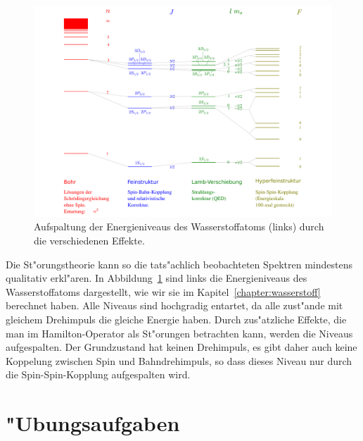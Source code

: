 \begin{figure}
\centering
\includegraphics[width=\hsize]{images/WasserstoffAufspaltung.pdf}
\caption{Aufspaltung der Energieniveaus des Wasserstoffatoms (links)
durch die verschiedenen Effekte.
\label{skript:wasserstoffaufspaltung}}
\end{figure}
Die St"orungstheorie kann so die tats"achlich beobachteten Spektren
mindestens qualitativ erkl"aren.
In Abbildung~\ref{skript:wasserstoffaufspaltung} sind links die Energieniveaus
des Wasserstoffatoms dargestellt, wie wir sie im Kapitel~\ref{chapter:wasserstoff}
berechnet haben.
Alle Niveaus sind hochgradig entartet, da alle zust"ande mit
gleichem Drehimpuls die gleiche Energie haben.
Durch zus"atzliche Effekte, die man im Hamilton-Operator als
St"orungen betrachten kann, werden die Niveaus aufgespalten.
Der Grundzustand hat keinen Drehimpuls, es gibt daher auch keine Koppelung
zwischen Spin und Bahndrehimpuls, so dass dieses Niveau nur durch die 
Spin-Spin-Kopplung aufgespalten wird.

\section{"Ubungsaufgaben}
\begin{uebungsaufgaben}
\item

\item

\end{uebungsaufgaben}
